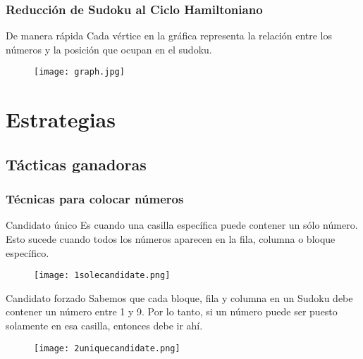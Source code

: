 \documentclass{beamer}
\begin{document}

\begin{frame}
\frametitle{Reducción de Sudoku al Ciclo Hamiltoniano}
\begin{block}{De manera rápida}
Cada vértice en la gráfica representa la relación entre los números y la posición que ocupan en el sudoku.
\end{block}
\begin{figure}
\centering
  \texttt{[image: graph.jpg]}
\end{figure}
\end{frame}


\section{Estrategias}

\subsection{Tácticas ganadoras}

\begin{frame}
\frametitle{Técnicas para colocar números}
\begin{block}{Candidato único}
Es cuando una casilla específica puede contener un sólo número. Esto sucede cuando todos los números aparecen en la fila, columna o bloque específico.
\end{block}
\begin{figure}[H]
  \centering
  \texttt{[image: 1solecandidate.png]}
\end{figure}
\end{frame}


\begin{frame}
\begin{block}{Candidato forzado}
Sabemos que cada bloque, fila y columna en un Sudoku debe contener un número entre 1 y 9. Por lo tanto, si un número puede ser puesto solamente en esa casilla, entonces debe ir ahí.
\end{block}
\begin{figure}[H]
  \centering
  \texttt{[image: 2uniquecandidate.png]}
\end{figure}
\end{frame}

\end{document}
